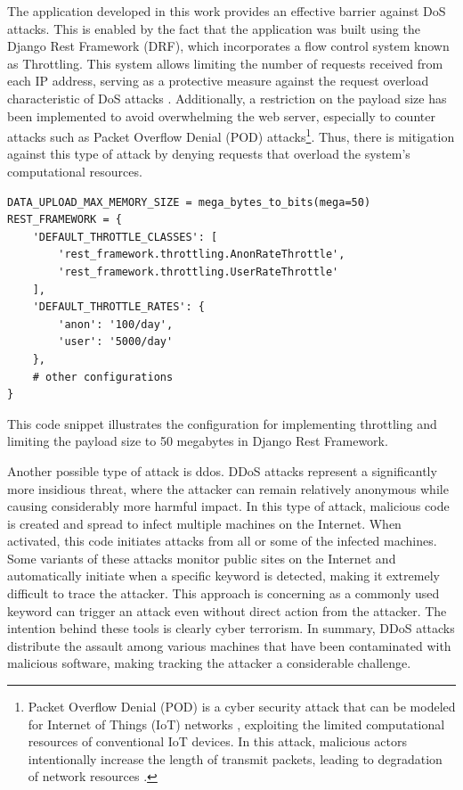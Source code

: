 The application developed in this work provides an effective barrier against DoS attacks. This is enabled by the fact that the application was built using the Django Rest Framework (DRF), which incorporates a flow control system known as Throttling. This system allows limiting the number of requests received from each IP address, serving as a protective measure against the request overload characteristic of DoS attacks \cite{drf-docs}. Additionally, a restriction on the payload size has been implemented to avoid overwhelming the web server, especially to counter attacks such as Packet Overflow Denial (POD) attacks\footnote{Packet Overflow Denial (POD) is a cyber security attack that can be modeled for Internet of Things (IoT) networks \cite{abdollahi_intrusion_2020}, exploiting the limited computational resources of conventional IoT devices. In this attack, malicious actors intentionally increase the length of transmit packets, leading to degradation of network resources \cite{acharya2016intrusion}.}. Thus, there is mitigation against this type of attack by denying requests that overload the system's computational resources.
\begin{listing}[!ht]
\begin{verbatim}
DATA_UPLOAD_MAX_MEMORY_SIZE = mega_bytes_to_bits(mega=50)
REST_FRAMEWORK = {
    'DEFAULT_THROTTLE_CLASSES': [
        'rest_framework.throttling.AnonRateThrottle',
        'rest_framework.throttling.UserRateThrottle'
    ],
    'DEFAULT_THROTTLE_RATES': {
        'anon': '100/day',
        'user': '5000/day'
    },
    # other configurations 
}
\end{verbatim}
\caption{This code snippet illustrates the configuration for implementing throttling and limiting the payload size to 50 megabytes in Django Rest Framework.}
\label{lst:throttle_config}
\end{listing}

Another possible type of attack is \acrfull{ddos}. DDoS attacks represent a significantly more insidious threat, where the attacker can remain relatively anonymous while causing considerably more harmful impact. In this type of attack, malicious code is created and spread to infect multiple machines on the Internet. When activated, this code initiates attacks from all or some of the infected machines. Some variants of these attacks monitor public sites on the Internet and automatically initiate when a specific keyword is detected, making it extremely difficult to trace the attacker. This approach is concerning as a commonly used keyword can trigger an attack even without direct action from the attacker. The intention behind these tools is clearly cyber terrorism. In summary, DDoS attacks distribute the assault among various machines that have been contaminated with malicious software, making tracking the attacker a considerable challenge.

